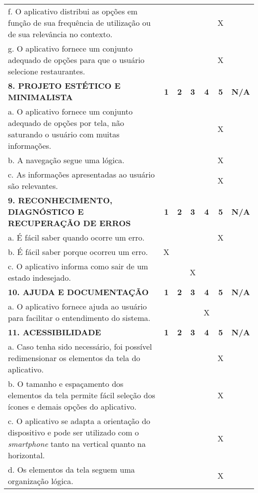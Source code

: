 \documentclass[portuguese,oneside]{tcc}
\begin{document}
\begin{center}
\begin{longtabu}{|L{25em}|c|c|c|c|c|c|}
	f. O aplicativo distribui as opções em função de sua frequência de utilização ou de sua relevância no contexto.	& & & & & X & \\ 
	g. O aplicativo fornece um conjunto adequado de opções para que o usuário selecione restaurantes. & & & & & X & \\ 
	\textbf{8. PROJETO ESTÉTICO E MINIMALISTA} & \textbf{1} & \textbf{2} & \textbf{3} & \textbf{4} & \textbf{5} & \textbf{N/A} \\ 
	a. O aplicativo fornece um conjunto adequado de opções por tela, não saturando o usuário com muitas informações. & & & & & X & \\ 
	b. A navegação segue uma lógica. & & & & & X & \\ 
	c. As informações apresentadas ao usuário são relevantes. & & & & & X & \\ 
	\textbf{9. RECONHECIMENTO, DIAGNÓSTICO E RECUPERAÇÃO DE ERROS} & \textbf{1} & \textbf{2} & \textbf{3} & \textbf{4} & \textbf{5} & \textbf{N/A} \\ 
	a. É fácil saber quando ocorre um erro.	& & & & & X & \\ 
	b. É fácil saber porque ocorreu um erro. & X & & & & & \\ 
	c. O aplicativo informa como sair de um estado indesejado. & & & X & & & \\ 
	\textbf{10. AJUDA E DOCUMENTAÇÃO} & \textbf{1} & \textbf{2} & \textbf{3} & \textbf{4} & \textbf{5} & \textbf{N/A} \\ 
	a. O aplicativo fornece ajuda ao usuário para facilitar o entendimento do sistema. & & & & X & & \\ 
	\textbf{11. ACESSIBILIDADE} & \textbf{1} & \textbf{2} & \textbf{3} & \textbf{4} & \textbf{5} & \textbf{N/A} \\ 
	a. Caso tenha sido necessário, foi possível redimensionar os elementos da tela do aplicativo. & & & & & X & \\ 
	b. O tamanho e espaçamento dos elementos da tela permite fácil seleção dos ícones e demais opções do aplicativo. & & & & & X & \\ 
	c. O aplicativo se adapta a orientação do dispositivo e pode ser utilizado com o \emph{smartphone} tanto na vertical quanto na horizontal. & & & & & X & \\ 
	d. Os elementos da tela seguem uma organização lógica. & & & & & X & \\ 

\end{longtabu}
\end{center}
\end{document}
